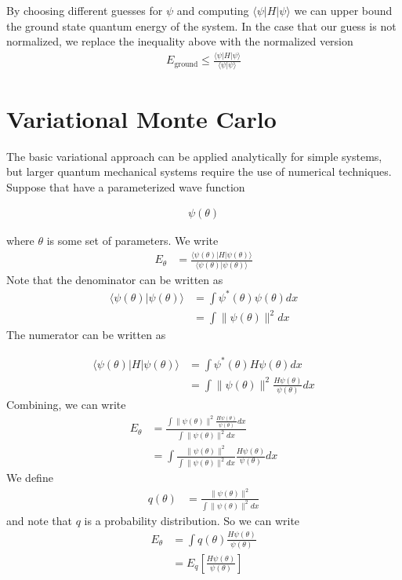 \documentclass[book.tex]{subfiles}
\begin{document}
By choosing different guesses for $\psi$ and computing $\langle \psi | H | \psi \rangle$ we can upper bound the ground state quantum energy of the system. In the case that our guess is not normalized, we replace the inequality above with the normalized version
\begin{align}
    E_{\textrm{ground}} \leq \frac{\langle \psi | H | \psi \rangle }{\langle \psi | \psi \rangle}
\end{align}


\section{Variational Monte Carlo}

The basic variational approach can be applied analytically for simple systems, but larger quantum mechanical systems require the use of numerical techniques. Suppose that have a parameterized wave function

\begin{align}
    \psi(\theta)
\end{align}

where $\theta$ is some set of parameters. We write
\begin{align}
    E_\theta &= \frac{\langle \psi(\theta) | H | \psi(\theta) \rangle }{\langle \psi(\theta) | \psi(\theta) \rangle}
\end{align}
Note that the denominator can be written as
\begin{align}
   \langle \psi(\theta) | \psi(\theta) \rangle &= \int \psi^*(\theta) \psi(\theta) dx \\
   &= \int \|\psi(\theta)\|^2 dx
\end{align}
The numerator can be written as

\begin{align}
    \langle \psi(\theta) | H | \psi(\theta) \rangle &= \int \psi^*(\theta) H \psi(\theta) dx \\
    &= \int \|\psi(\theta)\|^2 \frac{H \psi(\theta)}{\psi(\theta)} dx
\end{align}
Combining, we can write
\begin{align}
    E_{\theta} &= \frac{\int \|\psi(\theta)\|^2 \frac{H\psi(\theta)}{\psi(\theta)} dx}{\int \|\psi(\theta)\|^2 dx} \\
    &= \int \frac{\|\psi(\theta)\|^2}{\int \|\psi(\theta)\|^2 dx} \frac{H\psi(\theta)}{\psi(\theta)} dx
\end{align}
We define
\begin{align}
    q(\theta) &= \frac{\|\psi(\theta)\|^2}{\int \|\psi(\theta)\|^2 dx}
\end{align}
and note that $q$ is a probability distribution. So we can write
\begin{align}
    E_\theta &= \int q(\theta) \frac{H \psi(\theta)}{\psi(\theta)} \\ 
    &= E_q \left [\frac{H \psi(\theta)}{\psi(\theta)} \right ]
\end{align}
\end{document}
